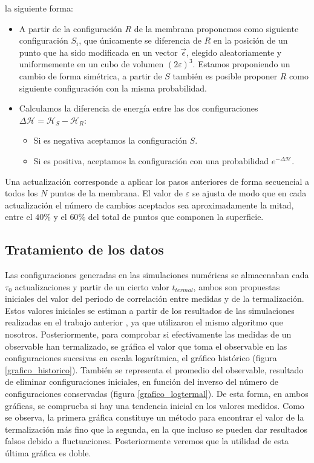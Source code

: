  la siguiente forma:
\begin{itemize}
\item A partir de la configuración $R$ de la membrana proponemos como
  siguiente configuración $S_i$, que únicamente se diferencia de $R$ en la
  posición de un punto que ha sido modificada en un vector $\vec{\epsilon}$,
  elegido aleatoriamente y uniformemente en un cubo de volumen 
  $(2\varepsilon)^3$. Estamos proponiendo un cambio de forma simétrica, a
  partir de $S$ también es posible proponer $R$ como siguiente configuración
  con la misma probabilidad.
\item Calculamos la diferencia de energía entre las dos configuraciones
  $\Delta\mathcal{H}=\mathcal{H}_S-\mathcal{H}_R$:
  \begin{itemize}
    \item Si es negativa aceptamos la configuración $S$.
    \item Si es positiva, aceptamos la configuración con una probabilidad $e^{-\Delta\mathcal{H}}$.
  \end{itemize}
\end{itemize}

Una actualización corresponde a aplicar los pasos anteriores de forma secuencial a
todos los $N$ puntos de la membrana. El valor de $\varepsilon$ se ajusta de
modo que en cada actualización el número de cambios aceptados sea aproximadamente la
mitad, entre el $40\%$ y el $60\%$ del total de puntos que componen la superficie. 
 
\subsection{Tratamiento de los datos}

Las configuraciones generadas en las simulaciones numéricas se almacenaban cada $\tau_0$
actualizaciones y partir de un cierto valor $t_{termal}$, ambos son propuestas
iniciales del valor del periodo de correlación entre medidas y de la
termalización. Estos valores iniciales se estiman a partir de los resultados de las
simulaciones realizadas en el trabajo anterior \cite{Bowick_flat_phase}, ya 
que utilizaron el mismo algoritmo que nosotros. Posteriormente, para comprobar
si efectivamente las medidas de un observable han termalizado, se
gráfica el valor que toma el observable en las
configuraciones sucesivas en escala logarítmica, el gráfico histórico (figura
\ref{grafico_historico}). También se representa el promedio del observable,
resultado de eliminar configuraciones iniciales, en función del inverso del
número de configuraciones conservadas (figura \ref{grafico_logtermal}). De
esta forma, en ambos gráficas, se comprueba si hay una tendencia inicial en
los valores medidos. Como se observa, la primera gráfica constituye un método
para encontrar el valor de la termalización más fino que la segunda,
en la que incluso se pueden dar resultados falsos debido a
fluctuaciones. Posteriormente veremos que la utilidad de esta última gráfica
es doble. 

